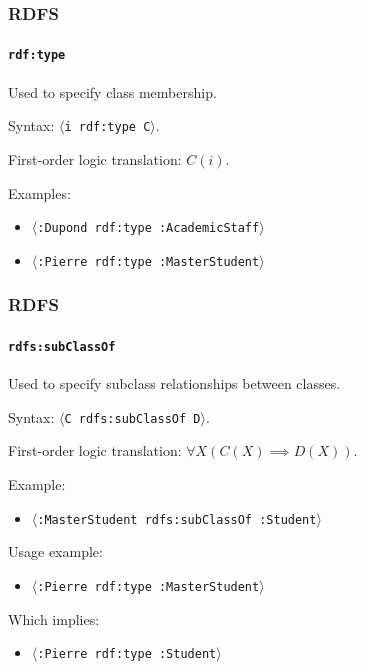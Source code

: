 \documentclass{beamer}
\newcommand{\triplet}[1]{$\langle$\texttt{#1}$\rangle$}
\begin{document}
\begin{frame}
  \frametitle{RDFS}
  \framesubtitle{\texttt{rdf:type}}

  Used to specify class membership.

  \pause

  \bigskip

  Syntax: \triplet{i rdf:type C}.

  \pause

  \medskip

  First-order logic translation: $C(i)$.

  \pause

  \bigskip

  Examples:

  \begin{itemize}
    \item \triplet{:Dupond rdf:type :AcademicStaff}
    \item \triplet{:Pierre rdf:type :MasterStudent}
  \end{itemize}
\end{frame}

\begin{frame}
  \frametitle{RDFS}
  \framesubtitle{\texttt{rdfs:subClassOf}}

  Used to specify subclass relationships between classes.

  \pause

  \bigskip

  Syntax: \triplet{C rdfs:subClassOf D}.

  \pause

  \medskip

  First-order logic translation: $\forall X (C(X) \implies D(X))$.

  \pause

  \bigskip

  Example:

  \begin{itemize}
    \item \triplet{:MasterStudent rdfs:subClassOf :Student}
  \end{itemize}

  \pause

  Usage example:

  \begin{itemize}
    \item \triplet{:Pierre rdf:type :MasterStudent}
  \end{itemize}

  \pause

  Which implies:

  \begin{itemize}
    \item \triplet{:Pierre rdf:type :Student}
  \end{itemize}
\end{frame}
\end{document}
